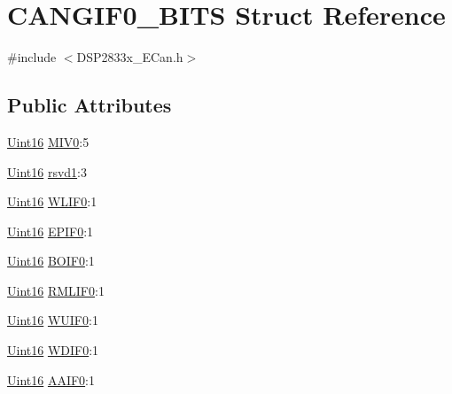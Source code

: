 \hypertarget{struct_c_a_n_g_i_f0___b_i_t_s}{}\section{C\+A\+N\+G\+I\+F0\+\_\+\+B\+I\+T\+S Struct Reference}
\label{struct_c_a_n_g_i_f0___b_i_t_s}


{\ttfamily \#include $<$D\+S\+P2833x\+\_\+\+E\+Can.\+h$>$}

\subsection*{Public Attributes}
\begin{DoxyCompactItemize}
\item 
\hyperlink{_d_s_p2833x___device_8h_a59a9f6be4562c327cbfb4f7e8e18f08b}{Uint16} \hyperlink{struct_c_a_n_g_i_f0___b_i_t_s_a83d727148ef6ff15be4a6bab1c848129}{M\+I\+V0}\+:5
\item 
\hyperlink{_d_s_p2833x___device_8h_a59a9f6be4562c327cbfb4f7e8e18f08b}{Uint16} \hyperlink{struct_c_a_n_g_i_f0___b_i_t_s_a0e0c7b72feec69a030b002c4dbaf5203}{rsvd1}\+:3
\item 
\hyperlink{_d_s_p2833x___device_8h_a59a9f6be4562c327cbfb4f7e8e18f08b}{Uint16} \hyperlink{struct_c_a_n_g_i_f0___b_i_t_s_abd439811cf6d193c0abcaef61268cd07}{W\+L\+I\+F0}\+:1
\item 
\hyperlink{_d_s_p2833x___device_8h_a59a9f6be4562c327cbfb4f7e8e18f08b}{Uint16} \hyperlink{struct_c_a_n_g_i_f0___b_i_t_s_a4430a81a0101f30db82158b87d99ddce}{E\+P\+I\+F0}\+:1
\item 
\hyperlink{_d_s_p2833x___device_8h_a59a9f6be4562c327cbfb4f7e8e18f08b}{Uint16} \hyperlink{struct_c_a_n_g_i_f0___b_i_t_s_a837570293461b56fbe6c47e1aa45a183}{B\+O\+I\+F0}\+:1
\item 
\hyperlink{_d_s_p2833x___device_8h_a59a9f6be4562c327cbfb4f7e8e18f08b}{Uint16} \hyperlink{struct_c_a_n_g_i_f0___b_i_t_s_aac65c677846ec91451d282c8aebfdf9b}{R\+M\+L\+I\+F0}\+:1
\item 
\hyperlink{_d_s_p2833x___device_8h_a59a9f6be4562c327cbfb4f7e8e18f08b}{Uint16} \hyperlink{struct_c_a_n_g_i_f0___b_i_t_s_aca21d2308d01455cbfa4750bef7d5f72}{W\+U\+I\+F0}\+:1
\item 
\hyperlink{_d_s_p2833x___device_8h_a59a9f6be4562c327cbfb4f7e8e18f08b}{Uint16} \hyperlink{struct_c_a_n_g_i_f0___b_i_t_s_a479a9eaebcb265c5e664225d6664afa9}{W\+D\+I\+F0}\+:1
\item 
\hyperlink{_d_s_p2833x___device_8h_a59a9f6be4562c327cbfb4f7e8e18f08b}{Uint16} \hyperlink{struct_c_a_n_g_i_f0___b_i_t_s_a11513792cdfbd4f39c7162ff280e2663}{A\+A\+I\+F0}\+:1

\end{DoxyCompactItemize}
